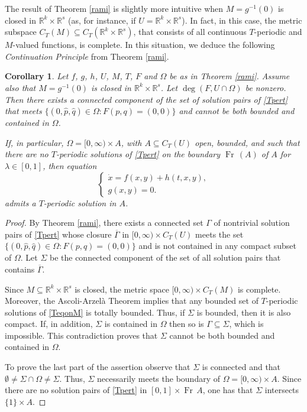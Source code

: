 \documentclass[a4paper]{amsart}
\numberwithin{equation}{section}
\newtheorem{corollary}[theorem]{Corollary}
\DeclareMathOperator{\Fr}{\mathrm{Fr}\,}
\newcommand{\cl}[1]{\overline{#1}}
\newcommand{\R}{\mathbb{R}}
\begin{document}
The result of Theorem \ref{rami} is slightly more intuitive when $M=g^{-1}(0)$ is 
closed in $\R^k\times\R^s$ (as, for instance, if $U=\R^k\times\R^s$). In fact, in 
this case, the metric subspace $C_T(M)\subseteq C_T(\R^k\times\R^s)$, that consists 
of all continuous $T$-periodic and $M$-valued functions, is complete. In this situation,
we deduce the following \emph{Continuation Principle} from Theorem \ref{rami}.

\begin{corollary}\label{corami}
Let $f$, $g$, $h$, $U$, $M$, $T$, $F$ and $\Omega$ be as in Theorem \ref{rami}. Assume 
also that $M=g^{-1}(0)$ is closed in $\R^k\times\R^s$. Let $\deg(F,U\cap\Omega)$ be nonzero.
Then there exists a connected component of the set of solution pairs of \eqref{Tpert}
that meets $\{(0,\hat p,\hat q)\in\Omega:F(p,q)=(0,0)\}$ and cannot be both bounded 
and contained in $\Omega$.

If, in particular, $\Omega=[0,\infty)\times A$, with $A\subseteq C_T(U)$ open, bounded, 
and such that there are no $T$-periodic solutions of \eqref{Tpert} on the boundary 
$\Fr (A)$ of $A$ for $\lambda\in [0,1]$, then equation 
\begin{equation}\label{contin}
 \left\{
\begin{array}{l}
 \dot x=f(x,y)+h(t,x,y),\\
 g(x,y)=0.
\end{array}
\right.
\end{equation}
admits a $T$-periodic solution in $A$.
\end{corollary}

\begin{proof}
By Theorem \ref{rami}, there exists a connected set $\Gamma$ of nontrivial solution 
pairs of \eqref{Tpert} whose closure $\cl\Gamma$ in $[0,\infty)\times C_T(U)$ meets 
the set $\{(0,\hat p,\hat q)\in\Omega:F(p,q)=(0,0)\}$ and is not contained in any 
compact subset of $\Omega$. Let $\Sigma$ be the connected component of the set of all
solution pairs that contains $\cl\Gamma$.

Since $M\subseteq\R^k\times\R^s$ is closed, the metric space $[0,\infty)\times C_T(M)$ 
is complete. Moreover, the Ascoli-Arzel\`a Theorem implies that any bounded set of 
$T$-periodic solutions of \eqref{TeqonM} is totally bounded. Thus, if $\Sigma$ is 
bounded, then it is also compact. If, in addition, $\Sigma$ is contained in $\Omega$ 
then so is $\Gamma\subseteq\Sigma$, which is impossible. This contradiction proves that 
$\Sigma$ cannot be both bounded and contained in $\Omega$.

To prove the last part of the assertion observe that $\Sigma$ is connected and that
$\emptyset\neq\Sigma\cap\Omega\neq\Sigma$. Thus, $\Sigma$ necessarily meets the boundary 
of $\Omega=[0,\infty)\times A$. Since there are no solution pairs of \eqref{Tpert} in 
$[0,1]\times\Fr A$, one has that $\Sigma$ intersects $\{1\}\times A$. 
\end{proof}
\end{document}
